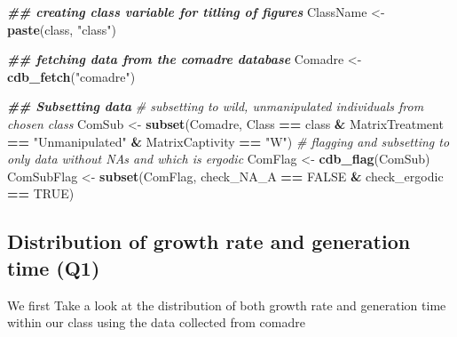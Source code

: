 \documentclass[
]{article}
\newenvironment{Shaded}{\begin{snugshade}}{\end{snugshade}}
\newcommand{\CommentTok}[1]{\textcolor[rgb]{0.56,0.35,0.01}{\textit{#1}}}
\newcommand{\ConstantTok}[1]{\textcolor[rgb]{0.56,0.35,0.01}{#1}}
\newcommand{\DocumentationTok}[1]{\textcolor[rgb]{0.56,0.35,0.01}{\textbf{\textit{#1}}}}
\newcommand{\FunctionTok}[1]{\textcolor[rgb]{0.13,0.29,0.53}{\textbf{#1}}}
\newcommand{\NormalTok}[1]{#1}
\newcommand{\OtherTok}[1]{\textcolor[rgb]{0.56,0.35,0.01}{#1}}
\newcommand{\SpecialCharTok}[1]{\textcolor[rgb]{0.81,0.36,0.00}{\textbf{#1}}}
\newcommand{\StringTok}[1]{\textcolor[rgb]{0.31,0.60,0.02}{#1}}
\begin{document}
\begin{Shaded}
\begin{Highlighting}[]
\DocumentationTok{\#\# creating class variable for titling of figures}
\NormalTok{ClassName }\OtherTok{\textless{}{-}} \FunctionTok{paste}\NormalTok{(class, }\StringTok{"class"}\NormalTok{)}

\DocumentationTok{\#\# fetching data from the comadre database}
\NormalTok{Comadre }\OtherTok{\textless{}{-}} \FunctionTok{cdb\_fetch}\NormalTok{(}\StringTok{"comadre"}\NormalTok{)}

\DocumentationTok{\#\# Subsetting data}
\CommentTok{\# subsetting to wild, unmanipulated individuals from chosen class}
\NormalTok{ComSub }\OtherTok{\textless{}{-}} \FunctionTok{subset}\NormalTok{(Comadre,}
\NormalTok{                   Class }\SpecialCharTok{==}\NormalTok{ class }\SpecialCharTok{\&}
\NormalTok{                   MatrixTreatment }\SpecialCharTok{==} \StringTok{"Unmanipulated"} \SpecialCharTok{\&}
\NormalTok{                   MatrixCaptivity }\SpecialCharTok{==} \StringTok{"W"}\NormalTok{)}
\CommentTok{\# flagging and subsetting to only data without NAs and which is ergodic}
\NormalTok{ComFlag }\OtherTok{\textless{}{-}} \FunctionTok{cdb\_flag}\NormalTok{(ComSub)}
\NormalTok{ComSubFlag }\OtherTok{\textless{}{-}} \FunctionTok{subset}\NormalTok{(ComFlag,}
\NormalTok{                      check\_NA\_A }\SpecialCharTok{==} \ConstantTok{FALSE} \SpecialCharTok{\&}
\NormalTok{                      check\_ergodic }\SpecialCharTok{==} \ConstantTok{TRUE}\NormalTok{)}
\end{Highlighting}
\end{Shaded}

\subsection{Distribution of growth rate and generation time
(Q1)}\label{distribution-of-growth-rate-and-generation-time-q1}

We first Take a look at the distribution of both growth rate and
generation time within our class using the data collected from comadre
\end{document}
